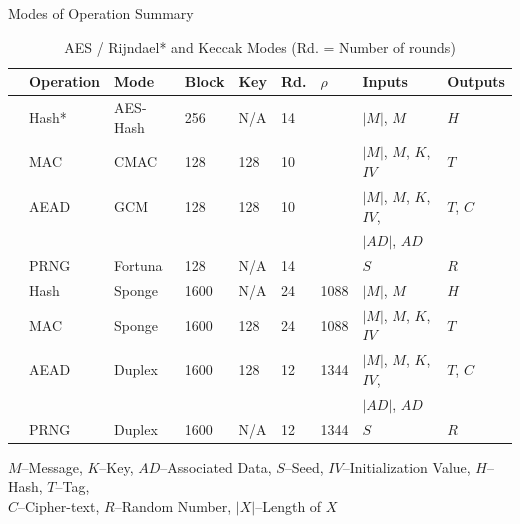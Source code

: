 \documentclass[final]{beamer}
\begin{document}
\begin{frame}[fragile]{}
\begin{columns}[t]
\begin{column}{.31\linewidth}
      \begin{block}{Modes of Operation Summary}
        \begin{table}[t]\setlength{\tabcolsep}{2.0pt}
         \centering
          \vspace{-2ex}%
          \caption{AES / Rijndael* and Keccak Modes \small (Rd. = Number of rounds)}\label{tab:aesmodes}
          \begin{tabular}{|l|l|l|llll|l|l|}\hline
            &Operation  &  Mode         & Block & Key & Rd.    &\hspace{1ex}$\rho$& Inputs                    & Outputs \\ \hline
            \parbox[t]{9mm}{}
            &Hash*      &  AES-Hash     & 256   & N/A & 14     &      &  $|M|$, $M$             & $H$       \\
            &MAC        &  CMAC         & 128   & 128 & 10     &      &  $|M|$, $M$, $K$, $IV$  & $T$       \\
            &AEAD       &  GCM          & 128   & 128 & 10     &      &  $|M|$, $M$, $K$, $IV$, & $T$, $C$  \\
            &           &               &       &     &        &      &  $|AD|$, $AD$           &           \\
            &PRNG       &  Fortuna      & 128   & N/A & 14     &      &  $S$                    & $R$       \\ \hline
            \parbox[t]{9mm}{}
            &Hash       & Sponge        & 1600  & N/A & 24     & 1088 &  $|M|$, $M$             & $H$      \\
            &MAC        & Sponge        & 1600  & 128 & 24     & 1088 &  $|M|$, $M$, $K$, $IV$  & $T$      \\
            &AEAD       & Duplex        & 1600  & 128 & 12     & 1344 &  $|M|$, $M$, $K$, $IV$, & $T$, $C$ \\
            &           &               &       &     &        &      &  $|AD|$, $AD$           &          \\
            &PRNG       & Duplex        & 1600  & N/A & 12     & 1344 &  $S$                    & $R$      \\ \hline
          \end{tabular}
        \end{table}
        \hspace{1ex}
        {
          \footnotesize $M$--Message, $K$--Key, $AD$--Associated Data, $S$--Seed, $IV$--Initialization Value, 
                        $H$--Hash, $T$--Tag, \\ \hspace{3.5ex}$C$--Cipher-text, $R$--Random Number, $|X|$--Length of $X$
        }
        \\
       \end{block}


\end{column}
\end{columns}
\end{frame}
\end{document}
